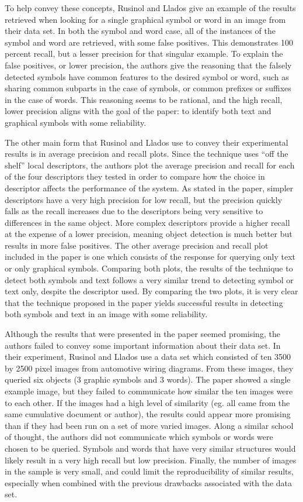 \documentclass[conference]{IEEEtran}
\begin{document}
To help convey these concepts, Rusinol and Llados give an example of the results retrieved when looking for a single graphical symbol or word in an image from their data set. In both the symbol and word case, all of the instances of the symbol and word are retrieved, with some false positives. This demonstrates 100 percent recall, but a lesser precision for that singular example. To explain the false positives, or lower precision, the authors give the reasoning that the falsely detected symbols have common features to the desired symbol or word, such as sharing common subparts in the case of symbols, or common prefixes or suffixes in the case of words. This reasoning seems to be rational, and the high recall, lower precision aligns with the goal of the paper: to identify both text and graphical symbols with some reliability.

The other main form that Rusinol and Llados use to convey their experimental results is in average precision and recall plots. Since the technique uses “off the shelf” local descriptors, the authors plot the average precision and recall for each of the four descriptors they tested in order to compare how the choice in descriptor affects the performance of the system. As stated in the paper, simpler descriptors have a very high precision for low recall, but the precision quickly falls as the recall increases due to the descriptors being very sensitive to differences in the same object. More complex descriptors provide a higher recall at the expense of a lower precision, meaning object detection is much better but results in more false positives. The other average precision and recall plot included in the paper is one which consists of the response for querying only text or only graphical symbols. Comparing both plots, the results of the technique to detect both symbols and text follows a very similar trend to detecting symbol or text only, despite the descriptor used. By comparing the two plots, it is very clear that the technique proposed in the paper yields successful results in detecting both symbols and text in an image with some reliability.

Although the results that were presented in the paper seemed promising, the authors failed to convey some important information about their data set. In their experiment, Rusinol and Llados use a data set which consisted of ten 3500 by 2500 pixel images from automotive wiring diagrams. From these images, they queried six objects (3 graphic symbols and 3 words). The paper showed a single example image, but they failed to communicate how similar the ten images were to each other. If the images had a high level of similarity (eg. all came from the same cumulative document or author), the results could appear more promising than if they had been run on a set of more varied images. Along a similar school of thought, the authors did not communicate which symbols or words were chosen to be queried. Symbols and words that have very similar structures would likely result in a very high recall but low precision. Finally, the number of images in the sample is very small, and could limit the reproducibility of similar results, especially when combined with the previous drawbacks associated with the data set.
\end{document}
